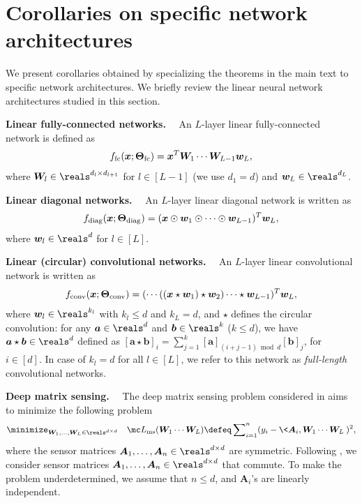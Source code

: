 \documentclass{article} %
\def\va{{\bm{a}}}
\def\vb{{\bm{b}}}
\def\vw{{\bm{w}}}
\def\vx{{\bm{x}}}
\def\mA{{\bm{A}}}
\def\mW{{\bm{W}}}
\newcommand{\bTheta}{\bm{\Theta}}
\newcommand{\bThetafc}{\bTheta_{\rm fc}}
\newcommand{\bThetadiag}{\bTheta_{\rm diag}}
\newcommand{\bThetaconv}{\bTheta_{\rm conv}}
\newcommand{\ffc}{f_{\rm fc}}
\newcommand{\fdiag}{f_{\rm diag}}
\newcommand{\fconv}{f_{\rm conv}}
\begin{document}
\section{Corollaries on specific network architectures}
\label{sec:deferred-corollaries}
We present corollaries obtained by specializing the theorems in the main text to specific network architectures. We briefly review the linear neural network architectures studied in this section.

\textbf{Linear fully-connected networks.}~~
An $L$-layer linear fully-connected network is defined as
\begin{equation}
\label{eq:fcnet-linear}
    \ffc (\vx; \bThetafc) = \vx^T \mW_1 \cdots \mW_{L-1} \vw_L,
\end{equation}
where $\mW_l \in \reals^{d_{l} \times d_{l+1}}$ for $l \in [L-1]$ (we use $d_1 = d$) and $\vw_L \in \reals^{d_{L}}$.

\textbf{Linear diagonal networks.}~~
An $L$-layer linear diagonal network is written as
\begin{align}
\label{eq:diagnet-linear}
    \fdiag (\vx; \bThetadiag) = (\vx \odot \vw_1 \odot \cdots \odot \vw_{L-1})^T \vw_L,
\end{align}
where $\vw_l \in \reals^d$ for $l \in [L]$. 

\textbf{Linear (circular) convolutional networks.}~~
An $L$-layer linear convolutional network is written as 
\begin{align}
\label{eq:convnet-linear}
    \fconv(\vx; \bThetaconv) = (\cdots((\vx \star \vw_1) \star \vw_2 ) \cdots  \star \vw_{L-1})^T \vw_L,
\end{align}
where $\vw_l \in \reals^{k_l}$ with $k_l \leq d$ and $k_L = d$, and $\star$ defines the circular convolution: for any $\va \in \reals^d$ and $\vb \in \reals^k$ ($k \leq d$), we have $\va \star \vb \in \reals^d$ defined as
$[\va \star \vb]_i = \sum_{j=1}^k [\va]_{(i+j-1) \bmod d} [\vb]_j$, for $i \in [d]$.
In case of $k_l = d$ for all $l \in [L]$, we refer to this network as \emph{full-length} convolutional networks.

\textbf{Deep matrix sensing.}~~
The deep matrix sensing problem considered in \citet{gunasekar2017implicit,arora2019implicit} aims to minimize the following problem
\begin{equation}
\label{eq:matrix-sensing}
    \minimize_{\mW_1, \dots, \mW_L \in \reals^{d \times d}}
    \quad
    \mc L_{\rm ms}(\mW_1 \cdots \mW_L) \defeq
    \sum\nolimits_{i=1}^n (y_i - \< \mA_i, \mW_1\cdots \mW_L \> )^2,
\end{equation}
where the sensor matrices $\mA_1, \dots, \mA_n \in \reals^{d \times d}$ are symmetric.
Following \citet{gunasekar2017implicit,arora2019implicit}, we consider sensor matrices $\mA_1, \dots, \mA_n \in \reals^{d \times d}$ that commute. To make the problem underdetermined, we assume that $n \leq d$, and $\mA_i$'s are linearly independent.
\end{document}
